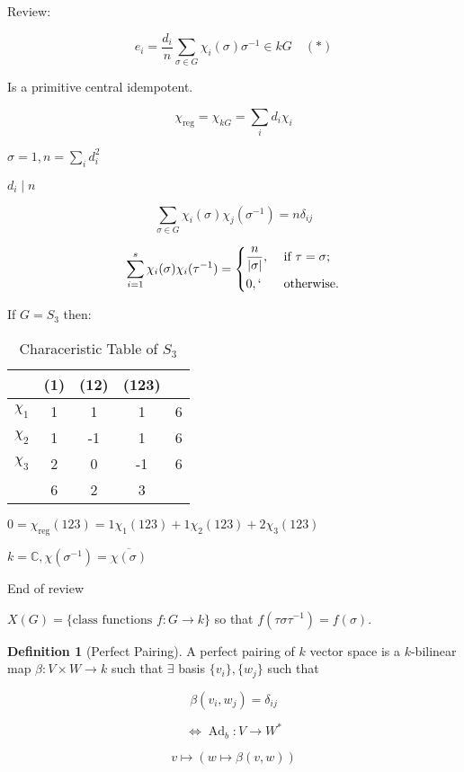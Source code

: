 \documentclass{article}
\theoremstyle{definition}
\newtheorem*{definition}{Definition}
\begin{document}
Review:

\[
    e_i = \frac{d_i}{n} \sum_{\sigma \in G} \chi _ i (\sigma) \sigma ^{-1} \in k G \quad (\ast)
\]

Is a primitive central idempotent.

\[
    \chi _{\text{reg}} = \chi _{kG} = \sum_{i} d_i \chi _ i
\]

\(\sigma = 1, n = \sum_{i} d_i ^ 2\) 

\(d_i \mid n\) 

\[
    \sum_{\sigma \in G} \chi _i(\sigma) \chi_j(\sigma ^{-1}) = n \delta_{ij}
\]

\[
    \sum_{i=1}^s \chi_i(\sigma) \chi_i(\tau^{-1}) = \begin{dcases}
        \frac{n}{\vert \sigma \vert}, &\text{ if } \tau = \sigma ;\\
        0, `&\text{ otherwise} .
    \end{dcases} 
\]

If \(G = S_3\) then:

\begin{table}[H]
    \centering
    \begin{tabular}{c|c|c|c || c}
        \toprule
             & (1) & (12) &  (123) & \\
        \midrule
            \(\chi_1\) & 1 & 1 &  1 & 6 \\
            \(\chi_2\) & 1 & -1 &  1 & 6 \\
            \(\chi_3\) & 2 & 0 &  -1 & 6 \\
            \midrule
            & 6 & 2 & 3 \\
        \bottomrule
    \end{tabular}
    \caption{Characeristic Table of \(S_3\)}
    \label{tab:chartable2}
\end{table}

\(0 = \chi_{\text{reg}}(123) = 1 \chi_1 (123) +1 \chi_2(123) + 2 \chi_3(123)\)

\(k = \mathbb{C} , \chi(\sigma ^{-1}) = \overline{\chi(\sigma)} \) 

End of review

\(X(G) = \{ \text{class functions } f: G \to k \}\) so that \(f(\tau \sigma \tau ^{-1}) = f(\sigma)\).

\begin{definition}
    [Perfect Pairing]

    A perfect pairing of \(k\) vector space is a \(k\)-bilinear map \(\beta : V \times W \to k\) such that \(\exists\) basis \(\{ v_i \}, \{ w_j \} \) such that

    \[
        \beta (v_i, w_j) = \delta_{ij}
    \]

    \[
        \iff \operatorname{Ad}_{b}: V \to W^{\ast} 
    \]

    \[
        v \mapsto (w \mapsto \beta(v,w))
    \]
\end{definition}
\end{document}
